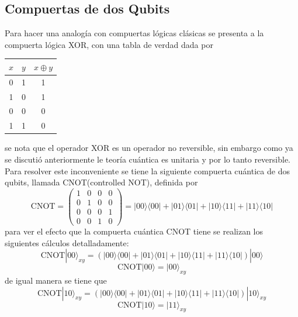 \documentclass[a4paper]{article}
\begin{document}
\subsection{Compuertas de dos Qubits}
Para hacer una analogía con compuertas lógicas clásicas se presenta a la compuerta lógica XOR, con una tabla de verdad dada por 
\begin{center}
\begin{tabular}{ |c|c|c| } 
 \hline
 $x$ & $y$ & $x\oplus y$ \\ \hline
 0   & 1   &   1\\
 1   & 0   &   1\\
 0   & 0   &   0\\
 1   & 1   &   0\\ 
 \hline
\end{tabular}
\end{center}
se nota que el operador XOR es un operador no reversible, sin embargo como ya se discutió anteriormente le teoría cuántica es unitaria y por lo tanto reversible. Para resolver este inconveniente se tiene la siguiente compuerta cuántica de dos qubits, llamada CNOT(controlled NOT), definida por
\begin{equation}
\text{CNOT}=
	\begin{pmatrix}
		1 & 0 & 0 & 0 \\
		0 & 1 & 0 & 0 \\
		0 & 0 & 0 & 1 \\
		0 & 0 & 1 & 0
	\end{pmatrix}=|00\rangle\langle 00|+|01\rangle\langle 01|+|10\rangle\langle 11|+|11\rangle\langle 10|
\end{equation}
para ver el efecto que la compuerta cuántica CNOT tiene se realizan los siguientes cálculos detalladamente:
\begin{equation}
\text{CNOT}|00\rangle_{xy}=(|00\rangle\langle 00|+|01\rangle\langle 01|+|10\rangle\langle 11|+|11\rangle\langle 10|)|00\rangle
\end{equation}
\begin{equation*}
\text{CNOT}|00\rangle=|00\rangle_{xy}
\end{equation*}
de igual manera se tiene que 
\begin{equation}
\text{CNOT}|10\rangle_{xy}=(|00\rangle\langle 00|+|01\rangle\langle 01|+|10\rangle\langle 11|+|11\rangle\langle 10|)|10\rangle_{xy}
\end{equation}
\begin{equation*}
\text{CNOT}|10\rangle=|11\rangle_{xy}
\end{equation*}
\end{document}
